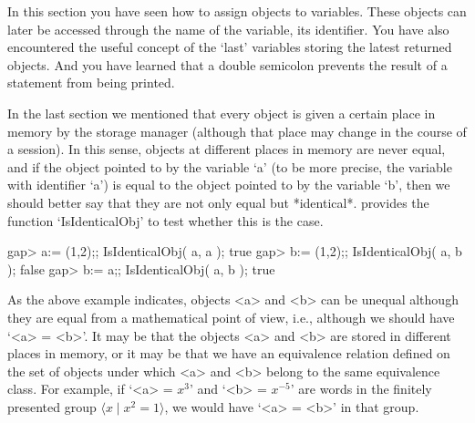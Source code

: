 In this section you  have seen how to  assign objects to variables. These
objects  can  later be accessed  through the  name  of the  variable, its
identifier. You  have also encountered the  useful concept of  the `last'
variables storing the latest returned  objects. And you have learned that
a double semicolon prevents the result of a statement from being printed.

\null

%
In the last section  we mentioned that every object   is given a  certain
place  in memory by the  {\GAP} storage manager  (although that place may
change in the course  of  a {\GAP}  session). In  this sense, objects  at
different places in memory are never equal, and if  the object pointed to
by the  variable  `a' (to be more  precise,  the variable with identifier
`a')  is  equal to the   object pointed to by  the  variable `b', then we
should better  say that they  are not only  equal but *identical*. {\GAP}
provides the function `IsIdenticalObj' to test whether this is the case.

\beginexample
gap> a:= (1,2);; IsIdenticalObj( a, a );
true
gap> b:= (1,2);; IsIdenticalObj( a, b );
false
gap> b:= a;; IsIdenticalObj( a, b );
true
\endexample

%

%

As the above example indicates, {\GAP}
objects  <a>  and  <b> can  be  unequal  although they are   equal from a
mathematical point of view, i.e., although we should have `<a> = <b>'. It
may  be that the objects <a>  and <b> are  stored  in different places in
memory, or it may be that we have  an equivalence relation defined on the
set of  objects under which <a>  and <b> belong   to the same equivalence
class.  For example, if `<a>  = $x^3$' and  `<b> = $x^{-5}$' are words in
the finitely presented group $\langle  x\mid x^2=1\rangle$, we would have
`<a> = <b>' in that group.

